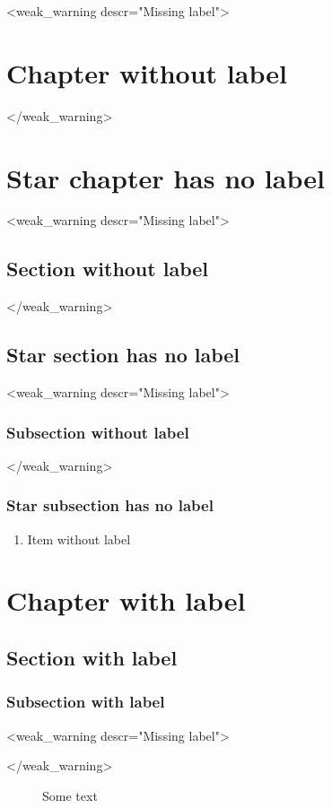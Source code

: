 \documentclass{article}
\begin{document}
    <weak_warning descr="Missing label">\chapter{Chapter without label}</weak_warning>
    \chapter*{Star chapter has no label}
    <weak_warning descr="Missing label">\section{Section without label}</weak_warning>
    \section*{Star section has no label}
    <weak_warning descr="Missing label">\subsection{Subsection without label}</weak_warning>
    \subsection*{Star subsection has no label}
    \begin{enumerate}
        \item Item without label
    \end{enumerate}
    \chapter{Chapter with label}
    \label{ch:chapter-label}
    \section{Section with label}
    \label{sec:section-label}
    \subsection{Subsection with label}
    \label{subsec:subsection-label}

    <weak_warning descr="Missing label">\begin{figure}
    \end{figure}</weak_warning>

    \begin{figure}
        \label{fig:figure-label}
    \end{figure}

    \begin{figure}
        \caption{Some text \label{fig:figure-caption-label}}
    \end{figure}
\end{document}
